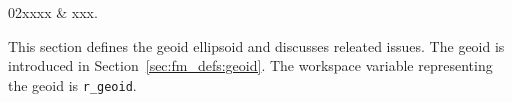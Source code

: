%
%
 \label{sec:ppath}

%
%
\starthistory
  02xxxx & xxx.\\
\stophistory


%
%
%




\label{sec:ppath:geoids}

This section defines the geoid ellipsoid and discusses releated
issues. The geoid is introduced in Section~\ref{sec:fm_defs:geoid}.
The workspace variable representing the geoid is \verb|r_geoid|.


